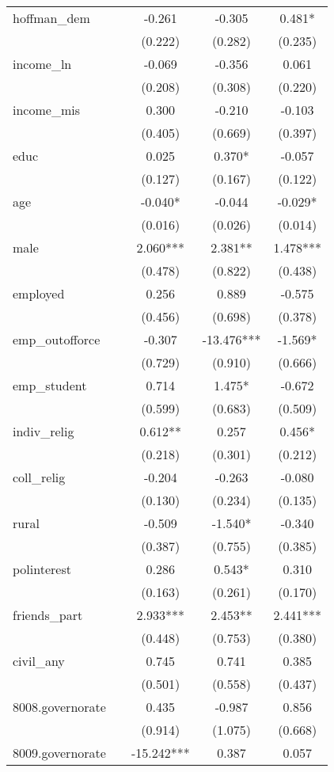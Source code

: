 \documentclass[]{article}
\begin{document}
\begin{tabular}{lcccc}
hoffman\_dem &  & -0.261 & -0.305 & 0.481* \\
 &  & (0.222) & (0.282) & (0.235) \\
income\_ln &  & -0.069 & -0.356 & 0.061 \\
 &  & (0.208) & (0.308) & (0.220) \\
income\_mis &  & 0.300 & -0.210 & -0.103 \\
 &  & (0.405) & (0.669) & (0.397) \\
educ &  & 0.025 & 0.370* & -0.057 \\
 &  & (0.127) & (0.167) & (0.122) \\
age &  & -0.040* & -0.044 & -0.029* \\
 &  & (0.016) & (0.026) & (0.014) \\
male &  & 2.060*** & 2.381** & 1.478*** \\
 &  & (0.478) & (0.822) & (0.438) \\
employed &  & 0.256 & 0.889 & -0.575 \\
 &  & (0.456) & (0.698) & (0.378) \\
emp\_outofforce &  & -0.307 & -13.476*** & -1.569* \\
 &  & (0.729) & (0.910) & (0.666) \\
emp\_student &  & 0.714 & 1.475* & -0.672 \\
 &  & (0.599) & (0.683) & (0.509) \\
indiv\_relig &  & 0.612** & 0.257 & 0.456* \\
 &  & (0.218) & (0.301) & (0.212) \\
coll\_relig &  & -0.204 & -0.263 & -0.080 \\
 &  & (0.130) & (0.234) & (0.135) \\
rural &  & -0.509 & -1.540* & -0.340 \\
 &  & (0.387) & (0.755) & (0.385) \\
polinterest &  & 0.286 & 0.543* & 0.310 \\
 &  & (0.163) & (0.261) & (0.170) \\
friends\_part &  & 2.933*** & 2.453** & 2.441*** \\
 &  & (0.448) & (0.753) & (0.380) \\
civil\_any &  & 0.745 & 0.741 & 0.385 \\
 &  & (0.501) & (0.558) & (0.437) \\
8008.governorate &  & 0.435 & -0.987 & 0.856 \\
 &  & (0.914) & (1.075) & (0.668) \\
8009.governorate &  & -15.242*** & 0.387 & 0.057 \\

\end{tabular}
\end{document}
